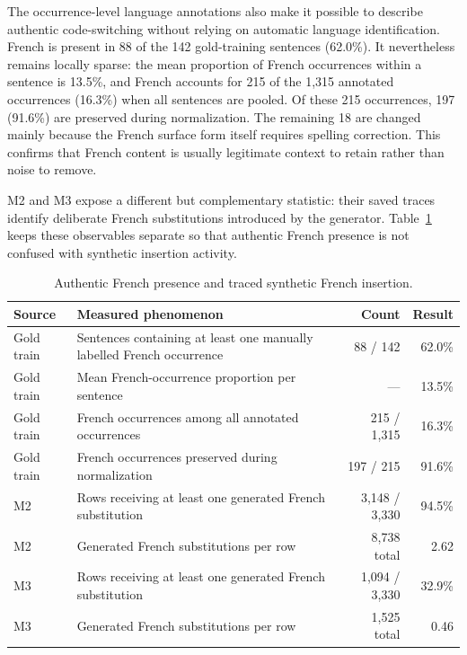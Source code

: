 \documentclass[12pt, a4paper, twoside, openany]{report}
\begin{document}
The occurrence-level language annotations also make it possible to describe authentic code-switching without relying on automatic language identification. French is present in 88 of the 142 gold-training sentences (62.0\%). It nevertheless remains locally sparse: the mean proportion of French occurrences within a sentence is 13.5\%, and French accounts for 215 of the 1,315 annotated occurrences (16.3\%) when all sentences are pooled. Of these 215 occurrences, 197 (91.6\%) are preserved during normalization. The remaining 18 are changed mainly because the French surface form itself requires spelling correction. This confirms that French content is usually legitimate context to retain rather than noise to remove.

M2 and M3 expose a different but complementary statistic: their saved traces identify deliberate French substitutions introduced by the generator. Table~\ref{tab:code-switching-profile} keeps these observables separate so that authentic French presence is not confused with synthetic insertion activity.

\begin{table}[H]
	\centering
	\caption{Authentic French presence and traced synthetic French insertion.}
	\label{tab:code-switching-profile}
	\small
	\renewcommand{\arraystretch}{1.12}
	\begin{tabularx}{\textwidth}{lXrr}
		\toprule
		\textbf{Source} & \textbf{Measured phenomenon} & \textbf{Count} & \textbf{Result} \\
		\midrule
		Gold train & Sentences containing at least one manually labelled French occurrence & 88 / 142 & 62.0\% \\
		Gold train & Mean French-occurrence proportion per sentence & --- & 13.5\% \\
		Gold train & French occurrences among all annotated occurrences & 215 / 1,315 & 16.3\% \\
		Gold train & French occurrences preserved during normalization & 197 / 215 & 91.6\% \\
		M2 & Rows receiving at least one generated French substitution & 3,148 / 3,330 & 94.5\% \\
		M2 & Generated French substitutions per row & 8,738 total & 2.62 \\
		M3 & Rows receiving at least one generated French substitution & 1,094 / 3,330 & 32.9\% \\
		M3 & Generated French substitutions per row & 1,525 total & 0.46 \\
		\bottomrule
	\end{tabularx}
\end{table}
\end{document}
